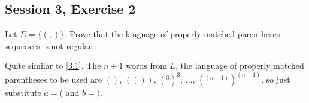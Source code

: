 \subsection{Session 3, Exercise 2}


Let $\Sigma = \{(,)\}$. Prove that the language of properly matched parentheses sequences is not regular.


Quite similar to \ref{3.1}. The $n+1$ words from $L$, the language of properly matched parentheses to be used are $()$, $(())$, $(^3)^3$, $\dots$, $(^{(n+1)})^{(n+1)}$, so just substitute $a = ($ and $b = )$.